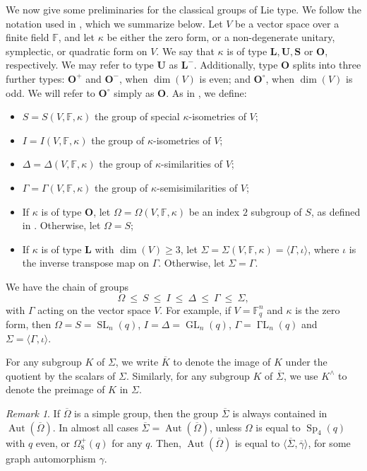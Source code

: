 \documentclass[11pt]{amsart}
\numberwithin{equation}{section}
\theoremstyle{definition}
\theoremstyle{remark}
\newtheorem{remark}[theorem]{Remark}
\newcommand{\Aut}{\mathop{\mathrm{Aut}}}
\DeclareMathOperator{\GL}{GL}
\DeclareMathOperator{\SL}{SL}
\newcommand{\boldL}{\mathbf{L}}
\DeclareMathOperator{\GammaL}{\Gamma L}
\newcommand{\boldU}{\mathbf{U}}
\newcommand{\boldS}{\mathbf{S}}
\DeclareMathOperator{\Sp}{Sp}
\newcommand{\boldO}{\mathbf{O}}
\begin{document}
We now give some preliminaries for the classical groups of Lie type.
We follow the notation used in \cite{KL90}, which we summarize below. Let $V$ be a vector space over a finite field $\mathbb{F}$, and let $\kappa$ be either the zero form, or a non-degenerate unitary, symplectic, or quadratic form on $V$. We say that $\kappa$ is of type $\boldL, \boldU, \boldS$ or $\boldO$, respectively. We may refer to type $\boldU$ as $\boldL^-$. Additionally, type $\boldO$ splits into three further types: $\boldO^+$ and $\boldO^-$, when $\dim(V)$ is even; and $\boldO^\circ$, when $\dim(V)$ is odd. We will refer to $\boldO^\circ$ simply as $\boldO$.
As in \cite[Ch.~2]{KL90}, we define:
\begin{itemize}
    \item $S = S(V, \mathbb{F}, \kappa)$ the group of special $\kappa$-isometries of $V$;
    \item $I = I(V, \mathbb{F}, \kappa)$ the group of $\kappa$-isometries of $V$;
    \item $\Delta = \Delta(V, \mathbb{F}, \kappa)$ the group of $\kappa$-similarities of $V$;
    \item $\Gamma = \Gamma(V, \mathbb{F}, \kappa)$ the group of $\kappa$-semisimilarities of $V$;
    \item If $\kappa$ is of type $\boldO$, let $\Omega = \Omega(V, \mathbb{F}, \kappa)$ be an index $2$ subgroup of $S$, as defined in \cite[Sec.~2.5]{KL90}. Otherwise, let $\Omega = S$;
    \item If $\kappa$ is of type $\boldL$ with $\dim(V) \geq 3$, let $\Sigma = \Sigma(V, \mathbb{F}, \kappa) = \langle \Gamma, \iota \rangle$, where $\iota$ is the inverse transpose map on $\Gamma$. Otherwise, let $\Sigma = \Gamma$. 
\end{itemize}
We have the chain of groups
 $$    \Omega \> \leqslant \> S \> \leqslant \> I \> \leqslant \> \Delta \> \leqslant \>  \Gamma \> \leqslant \> \Sigma, $$
with $\Gamma$ acting on the vector space $V$.
For example, if $V=\mathbb{F}_q^n$ and $\kappa$ is the zero form, then
$\Omega = S = \SL_n(q)$, $I = \Delta = \GL_n(q)$, $\Gamma = \GammaL_n(q)$ and $\Sigma = \langle \Gamma, \iota \rangle$.

For any subgroup $K$ of $\Sigma$, we write $\overline K$ to denote the image of $K$ under the quotient by the scalars of $\Sigma$.
Similarly, for any subgroup $K$ of $\overline \Sigma$, we use $K^\wedge$ to denote the preimage of $K$ in $\Sigma$.

\begin{remark} \label{remark:exceptionalgraphs}
    If $\overline \Omega$ is a simple group, then the group $\overline \Sigma$ is always contained in $\Aut(\overline \Omega)$. In almost all cases $\overline \Sigma = \Aut(\overline \Omega)$, unless $\Omega$ is equal to $\Sp_4(q)$ with $q$ even, or $\Omega_8^+(q)$ for any $q$. Then, $\Aut(\overline \Omega)$ is equal to $\langle \overline \Sigma, \overline \gamma \rangle$, for some graph automorphism $\gamma$.
\end{remark}
\end{document}
